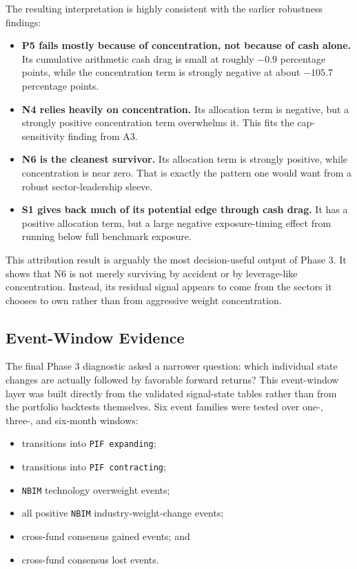 \documentclass[conference]{IEEEtran}
\begin{document}
The resulting interpretation is highly consistent with the earlier robustness findings:
\begin{itemize}[leftmargin=1.4em]
    \item \textbf{P5 fails mostly because of concentration, not because of cash alone.} Its cumulative arithmetic cash drag is small at roughly $-0.9$ percentage points, while the concentration term is strongly negative at about $-105.7$ percentage points.
    \item \textbf{N4 relies heavily on concentration.} Its allocation term is negative, but a strongly positive concentration term overwhelms it. This fits the cap-sensitivity finding from A3.
    \item \textbf{N6 is the cleanest survivor.} Its allocation term is strongly positive, while concentration is near zero. That is exactly the pattern one would want from a robust sector-leadership sleeve.
    \item \textbf{S1 gives back much of its potential edge through cash drag.} It has a positive allocation term, but a large negative exposure-timing effect from running below full benchmark exposure.
\end{itemize}

This attribution result is arguably the most decision-useful output of Phase 3. It shows that N6 is not merely surviving by accident or by leverage-like concentration. Instead, its residual signal appears to come from the sectors it chooses to own rather than from aggressive weight concentration.

\subsection{Event-Window Evidence}

The final Phase 3 diagnostic asked a narrower question: which individual state changes are actually followed by favorable forward returns? This event-window layer was built directly from the validated signal-state tables rather than from the portfolio backtests themselves. Six event families were tested over one-, three-, and six-month windows:
\begin{itemize}[leftmargin=1.4em]
    \item transitions into \texttt{PIF expanding};
    \item transitions into \texttt{PIF contracting};
    \item \texttt{NBIM} technology overweight events;
    \item all positive \texttt{NBIM} industry-weight-change events;
    \item cross-fund consensus gained events; and
    \item cross-fund consensus lost events.
\end{itemize}
\end{document}
